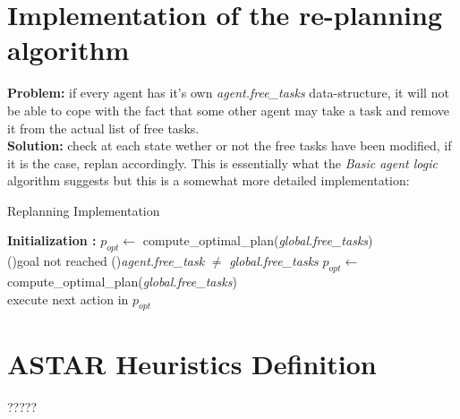 \documentclass[11pt]{article}
\begin{document}
\section{Implementation of the re-planning algorithm}

\textbf{Problem: }if every agent has it's own \emph{agent.free\_tasks} data-structure, it will not be able to cope with the fact that some other agent may take a task and remove it from the actual list of free tasks.\\
\textbf{Solution: }check at each state wether or not the free tasks have been modified, if it is the case, replan accordingly. This is essentially what the \emph{Basic agent logic} algorithm suggests but this is a somewhat more detailed implementation:

\begin{algorithm}
    \SetAlgoLined
    \caption{Replanning Implementation}
    \textbf{Initialization :} $p_{opt}\leftarrow $ compute\_optimal\_plan(\emph{global.free\_tasks})  \\
    \While(){goal not reached}{
        \If(){\emph{agent.free\_task} $\neq$ \emph{global.free\_tasks}}{
            $p_{opt} \leftarrow$ compute\_optimal\_plan(\emph{global.free\_tasks}) \\
        }
        execute next action in $p_{opt}$
    }
\end{algorithm}

\section{ASTAR Heuristics Definition}
?????
\end{document}
